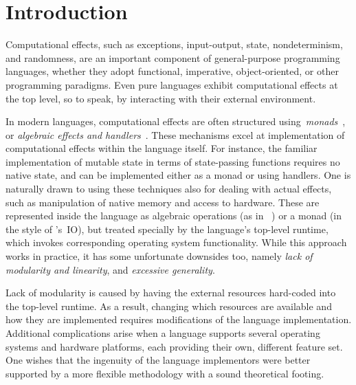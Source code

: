
\section{Introduction}
\label{sect:introduction}

Computational effects, such as exceptions, input-output, state, nondeterminism, and
randomness, are an important component of general-purpose programming languages,
whether they adopt functional, imperative, object-oriented, or other
programming paradigms. Even pure languages exhibit
computational effects at the top level, so to speak, by interacting with their
external environment.

In modern languages, computational effects are often
structured using~\emph{monads}~\cite{Moggi:ComputationalLambdaCalculus,Moggi:NotionsofComputationandMonads,Wadler:Monads},
or \emph{algebraic effects and handlers}~\cite{Kammar:Handlers,Plotkin:NotionsOfComputation,Plotkin:HandlingEffects}.
These mechanisms excel at implementation of computational effects within
the language itself. For instance, the familiar implementation of mutable state in terms of state-passing functions requires no native state, and can be implemented either as a monad or using handlers.
%
One is naturally drawn to using these techniques also for dealing with actual effects, such as manipulation of native memory and access to  hardware. These are represented inside the language as algebraic operations (as in ~\cite{Bauer:AlgebraicEffects}) or a monad (in the style of 's~\textsf{IO}), but treated specially by the language's top-level runtime, which invokes corresponding operating system functionality.
%
While this approach works in practice, it has some unfortunate downsides too, namely \emph{lack of modularity and
linearity}, and \emph{excessive generality}.

Lack of modularity is caused by having the external resources hard-coded into the top-level runtime.
As a result, changing which resources are available and how they are implemented requires modifications of the language implementation. Additional complications arise when a language supports several operating systems and hardware platforms, each providing their own, different feature set. One wishes that the ingenuity of the language implementors were better supported by a more flexible methodology with a sound theoretical footing.


